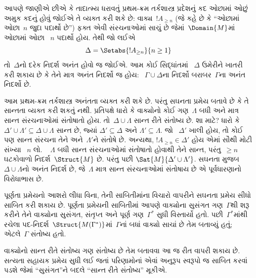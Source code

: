 %
\begin{ex}
આપણે જાણીએ છીએ કે તાદાત્મ્ય ધરાવતું પ્રથમ-ક્રમ તર્કશાસ્ત્ર
પ્રદેશનું કદ ઓછામાં ઓછું અમુક કદનું હોવું જોઈએ તે વ્યક્ત કરી શકે
છે: વાક્ય~$!A_{\ge n}$ (જે કહે છે કે ``ઓછામાં ઓછા~$n$ જુદા પદાર્થો
છે'') ફક્ત એવી સંરચનાઓમાં સાચું છે જેમાં~$\Domain{M}$માં ઓછામાં ઓછા
~$n$ પદાર્થો હોય. તેથી જો લઈએ
  \[
  \Delta = \Setabs{!A_{\ge n}}{n \ge 1}
  \]
તો~$\Delta$નો દરેક નિદર્શ અનંત હોવો જ જોઈએ. આમ કોઈ સિદ્ધાંતમાં
~$\Delta$ ઉમેરીને ખાતરી કરી શકાય છે કે તેને માત્ર અનંત નિદર્શો જ હોય:
~$\Gamma\cup\Delta$ના નિદર્શો બરાબર~$\Gamma$ના અનંત નિદર્શો છે.

આમ પ્રથમ-ક્રમ તર્કશાસ્ત્ર અનંતતા વ્યક્ત કરી શકે છે. પરંતુ સઘનતા પ્રમેય
બતાવે છે કે તે સાન્તતા વ્યક્ત કરી શકતું નથી. પ્રતિપક્ષે ધારો કે
વાક્યોનો કોઈ ગણ~$\Lambda$ બધી અને માત્ર સાન્ત સંરચનાઓમાં
સંતોષાતો હોય. તો~$\Delta\cup\Lambda$ સાન્ત રીતે સંતોષ્ય છે. શા માટે?
ધારો કે $\Delta'\cup\Lambda'\subseteq\Delta\cup\Lambda$ સાન્ત છે,
જ્યાં $\Delta'\subseteq\Delta$ અને $\Lambda'\subseteq\Lambda$. જો
~$\Delta'$ ખાલી હોય, તો કોઈ પણ સાન્ત સંરચના તેને અને~$\Lambda'$ને
સંતોષે છે. અન્યથા, $!A_{\ge n}\in\Delta'$ હોય એમાં સૌથી મોટી સંખ્યા
~$n$ લો. ~ $\Lambda$ બધી સાન્ત સંરચનાઓમાં સંતોષાતો હોવાથી તેને સાન્ત,
પરંતુ~$\ge n$ ઘટકોવાળો નિદર્શ~$\Struct{M}$ છે. પરંતુ
પછી $\Sat{M}{\Delta'\cup\Lambda'}$. સઘનતા મુજબ
~$\Delta\cup\Lambda$નો અનંત નિદર્શ છે, જે~$\Lambda$ માત્ર સાન્ત
સંરચનાઓમાં સંતોષાય છે એ પૂર્વધારણાનો વિરોધાભાસ છે.
\end{ex}

\endgroup


\begingroup
\makeatletter{}\makeatother


\label{guunit:OLP-0136}


પૂર્ણતા પ્રમેયનો આશરો લીધા વિના, તેની સાબિતીમાંના વિચારો વાપરીને
સઘનતા પ્રમેય સીધો સાબિત કરી શકાય છે. પૂર્ણતા પ્રમેયની સાબિતીમાં આપણે
વાક્યોના સુસંગત ગણ~$\Gamma$થી શરૂ કરીને તેને વાક્યોના
સુસંગત, સંતૃપ્ત અને પૂર્ણ ગણ~$\Gamma^*$ સુધી
વિસ્તાર્યો હતો. પછી~$\Gamma^*$માંથી રચેલા
પદ-નિદર્શ~$\Struct{M(\Gamma^*)}$માં~$\Gamma$નાં બધાં વાક્યો સાચાં છે
તેમ બતાવ્યું હતું; એટલે~$\Gamma$ સંતોષ્ય હતો.

વાક્યોનો સાન્ત રીતે સંતોષ્ય ગણ સંતોષ્ય છે તેમ બતાવવા આ જ રીત વાપરી
શકાય છે. સત્યતા સહાયક પ્રમેય સુધી લઈ જતાં પરિણામોનાં એવાં અનુરૂપ
સ્વરૂપો જ સાબિત કરવાં પડશે જેમાં ``સુસંગત''ને બદલે ``સાન્ત રીતે
સંતોષ્ય'' મૂકીએ.

